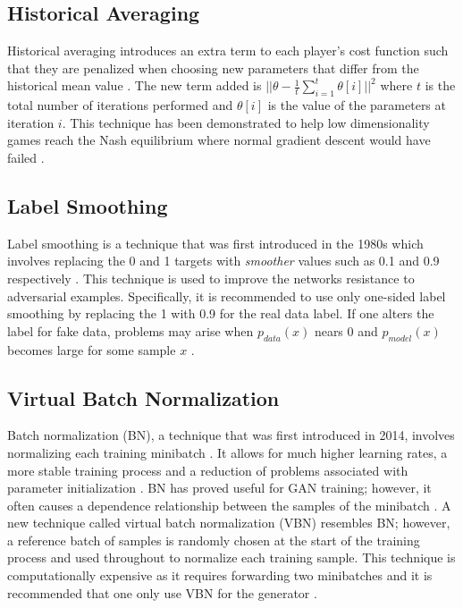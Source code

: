 \documentclass[11pt]{article}
\begin{document}
\subsection{Historical Averaging}
Historical averaging introduces an extra term to each player's cost function such that they are penalized when choosing new parameters that differ from the historical mean value \citep{2016arXiv160603498S}. The new term added is $||\theta - \frac{1}{t}\sum_{i=1}^{t}\theta[i]||^2$ where $t$ is the total number of iterations performed and $\theta[i]$ is the value of the parameters at iteration $i$. This technique has been demonstrated to help low dimensionality games reach the Nash equilibrium where normal gradient descent would have failed \citep{2016arXiv160603498S}.

\subsection{Label Smoothing}
Label smoothing is a technique that was first introduced in the 1980s which involves replacing the 0 and 1 targets with \textit{smoother} values such as 0.1 and 0.9 respectively \citep{2016arXiv160603498S}. This technique is used to improve the networks resistance to adversarial examples. Specifically, it is recommended to use only one-sided label smoothing by replacing the 1 with 0.9 for the real data label. If one alters the label for fake data, problems may arise when $p_{data}(x)$ nears $0$ and $p_{model}(x)$ becomes large for some sample $x$ \citep{2016arXiv160603498S}.

\subsection{Virtual Batch Normalization}
Batch normalization (BN), a technique that was first introduced in 2014, involves normalizing each training minibatch \citep{2015arXiv150203167I}. It allows for much higher learning rates, a more stable training process and a reduction of problems associated with parameter initialization \citep{2015arXiv150203167I}. BN has proved useful for GAN training; however, it often causes a dependence relationship between the samples of the minibatch \citep{2016arXiv160603498S}. A new technique called virtual batch normalization (VBN) resembles BN; however, a reference batch of samples is randomly chosen at the start of the training process and used throughout to normalize each training sample. This technique is computationally expensive as it requires forwarding two minibatches and it is recommended that one only use VBN for the generator \citep{2016arXiv160603498S}.
\end{document}
